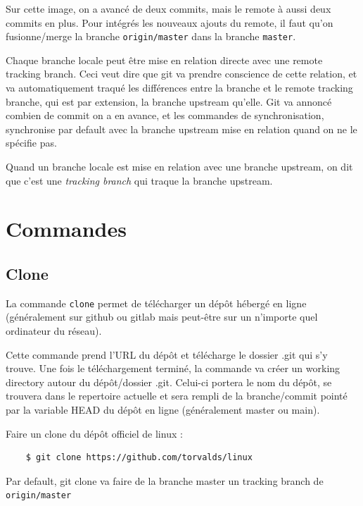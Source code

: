 \documentclass[a4paper, 12pt]{article}
\begin{document}
    Sur cette image, on a avancé de deux commits, mais le remote à aussi deux 
    commits en plus. Pour intégrés les nouveaux ajouts du remote, il faut
    qu'on fusionne/merge la branche \lstinline{origin/master} dans la branche
    \lstinline{master}.

    Chaque branche locale peut être mise en relation directe avec une remote
    tracking branch. Ceci veut dire que git va prendre conscience de cette
    relation, et va automatiquement traqué les différences entre la branche
    et le remote tracking branche, qui est par extension, la branche upstream
    qu'elle. Git va annoncé combien de commit on a en avance, et les 
    commandes de synchronisation, synchronise par default avec la branche
    upstream mise en relation quand on ne le spécifie pas.

    Quand un branche locale est mise en relation avec une branche upstream, 
    on dit que c'est une \textit{tracking branch} qui traque la branche
    upstream.  

    \section{Commandes}\label{se:commandes}
    \subsection{Clone}
    La commande \lstinline{clone} permet de télécharger un dépôt hébergé en
    ligne (généralement sur github ou gitlab mais peut-être sur un n'importe
    quel ordinateur du réseau).

    Cette commande prend l'URL du dépôt et télécharge le dossier .git qui s'y
    trouve. Une fois le téléchargement terminé, la commande va créer un working
    directory autour du dépôt/dossier .git. Celui-ci portera le nom du dépôt, se
    trouvera dans le repertoire actuelle et sera rempli de la branche/commit
    pointé par la variable HEAD du dépôt en ligne (généralement master ou main).  

    Faire un clone du dépôt officiel de linux : 
    \begin{lstlisting}
    $ git clone https://github.com/torvalds/linux
    \end{lstlisting}

    Par default, git clone va faire de la branche master un tracking branch de
    \lstinline{origin/master}
\end{document}
